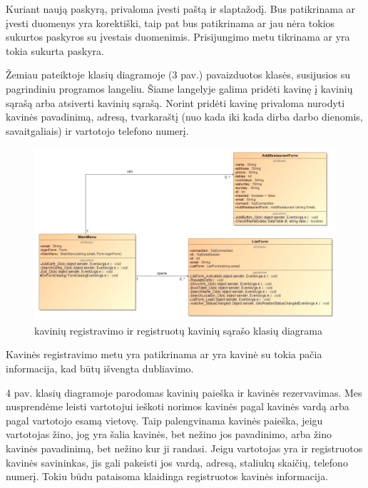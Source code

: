 \documentclass{VUMIFPSkursinis}
\begin{document}
Kuriant naują paskyrą, privaloma įvesti paštą ir slaptažodį. Bus patikrinama ar įvesti duomenys yra korektiški, taip pat bus patikrinama ar jau nėra tokios sukurtos paskyros su įvestais duomenimis. Prisijungimo metu tikrinama ar yra tokia sukurta paskyra.

\pagebreak
Žemiau pateiktoje klasių diagramoje (3 pav.) pavaizduotos klasės, susijusios su pagrindiniu programos langeliu. Šiame langelyje galima pridėti kavinę į kavinių sąrašą arba atsiverti kavinių sąrašą. Norint pridėti kavinę privaloma nurodyti kavinės pavadinimą, adresą, tvarkaraštį (nuo kada iki kada dirba darbo dienomis, savaitgaliais) ir vartotojo telefono numerį.
\newline
\newline
\newline
\newline
\newline
\newline
\begin{figure}[H]
    \centering
    \includegraphics[width=\textwidth,height=\textheight,keepaspectratio]{img/MainMenu_AddRestaurant_ListForm} 
    \caption{kavinių registravimo ir registruotų kavinių sąrašo klasių diagrama}
    \label{img:MainMenu_AddRestaurant_ListForm}
\end{figure}

Kavinės registravimo metu yra patikrinama ar yra kavinė su tokia pačia informacija, kad būtų išvengta dubliavimo.

\pagebreak
4 pav. klasių diagramoje parodomas kavinių paieška ir kavinės rezervavimas. Mes nusprendėme leisti vartotojui ieškoti norimos kavinės pagal kavinės vardą arba pagal vartotojo esamą vietovę. Taip palengvinama kavinės paieška, jeigu vartotojas žino, jog yra šalia kavinės, bet nežino jos pavadinimo, arba žino kavinės pavadinimą, bet nežino kur ji randasi. Jeigu vartotojas yra ir registruotos kavinės savininkas, jis  gali pakeisti jos vardą, adresą, staliukų skaičių, telefono numerį. Tokiu būdu pataisoma klaidinga registruotos kavinės informacija.
\newline
\newline
\newline
\newline
\newline
\newline
\newline
\newline
\end{document}
